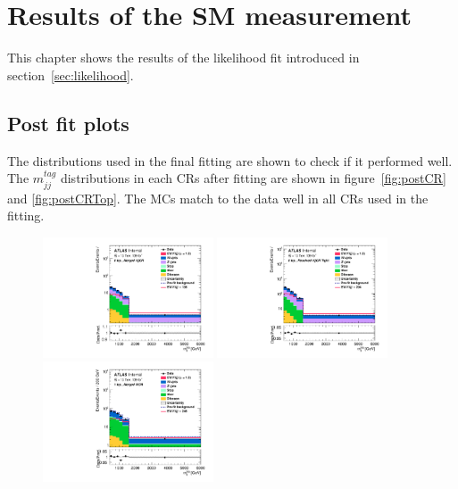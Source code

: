 \chapter{Results of the SM measurement}
\label{chap:results}

This chapter shows the results of the likelihood fit introduced in section~\ref{sec:likelihood}.
\section{Post fit plots}
The distributions used in the final fitting are shown to check if it performed well.
The $m^{tag}_{jj}$ distributions in each CRs after fitting are shown in figure~\ref{fig:postCR} and \ref{fig:postCRTop}.
The MCs match to the data well in all CRs used in the fitting.
\begin{figure}[H]
    \centering
    \includegraphics[width=0.45\textwidth]{figures/PostFit/Region_distMTagJets_DCRVjetMer_BMin0_J0_incJet1_L0_T0_incFat1_Y6051_incTag1_Fat1_GlobalFit_unconditionnal_mu1log}
    \includegraphics[width=0.45\textwidth]{figures/PostFit/Region_distMTagJets_DCRVjetFid_BMin0_T0_Y6051_incTag1_J2_L0_incJet1_GlobalFit_unconditionnal_mu1log}
    \\
    \includegraphics[width=0.45\textwidth]{figures/PostFit/Region_disttagMjj_DCRVjetMerged_BMin0_J0_incJet1_L1_T0_incFat1_Y6051_incTag1_Fat1_GlobalFit_unconditionnal_mu1log}

\end{figure}
